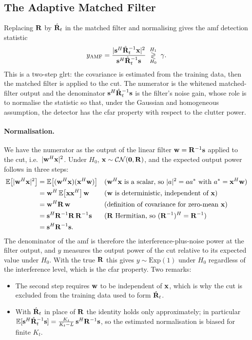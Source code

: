 \documentclass{article}
\begin{document}
\subsection{The Adaptive Matched Filter}
Replacing $\vb R$ by $\hat{\mathbf{R}}_t$ in the matched filter and normalising gives the \gls{amf} detection statistic
$$y_{\text{AMF}} = \frac{|\vb s^H\hat{\mathbf{R}}_t^{-1}\vb x|^2}
                        {\vb s^H\hat{\mathbf{R}}_t^{-1}\vb s}
   \;\underset{H_0}{\overset{H_1}{\gtrless}}\;\gamma.$$
This is a two-step \gls{glrt}: the covariance is estimated from the training data, then the matched filter is applied to the \gls{cut}. The numerator is the whitened matched-filter output and the denominator $\vb s^H\hat{\mathbf{R}}_t^{-1}\vb s$ is the filter's noise gain, whose role is to normalise the statistic so that, under the Gaussian and homogeneous assumption, the detector has the \gls{cfar} property with respect to the clutter power.

\paragraph{Normalisation.} We have the numerator as the output of the linear filter $\vb w = \mathbf{R}^{-1}\vb s$ applied to the \gls{cut}, i.e.\ $|\vb w^H\vb x|^2$. Under $H_0$, $\vb x\sim\mathcal{CN}(\vb 0,\mathbf{R})$, and the expected output power follows in three steps:
\begin{align*}
  \mathbb{E}\big[|\vb w^H\vb x|^2\big]
  &= \mathbb{E}\big[(\vb w^H\vb x)(\vb x^H\vb w)\big]
     && \text{($\vb w^H\vb x$ is a scalar, so $|a|^2=aa^*$ with $a^*=\vb x^H\vb w$)}\\
  &= \vb w^H\,\mathbb{E}\big[\vb x\vb x^H\big]\,\vb w
     && \text{($\vb w$ is deterministic, independent of $\vb x$)}\\
  &= \vb w^H\mathbf{R}\,\vb w
     && \text{(definition of covariance for zero-mean $\vb x$)}\\
  &= \vb s^H\mathbf{R}^{-1}\mathbf{R}\,\mathbf{R}^{-1}\vb s
     && \text{($\mathbf{R}$ Hermitian, so $(\mathbf{R}^{-1})^H=\mathbf{R}^{-1}$)}\\
  &= \vb s^H\mathbf{R}^{-1}\vb s.
\end{align*}
The denominator of the \gls{amf} is therefore the interference-plus-noise power at the filter output, and $y$ measures the output power of the \gls{cut} relative to its expected value under $H_0$. With the true $\mathbf{R}$ this gives $y\sim\mathrm{Exp}(1)$ under $H_0$ regardless of the interference level, which is the \gls{cfar} property. Two remarks:
\begin{itemize}
  \item The second step requires $\vb w$ to be independent of $\vb x$, which is why the \gls{cut} is excluded from the training data used to form $\hat{\mathbf{R}}_t$.
  \item With $\hat{\mathbf{R}}_t$ in place of $\mathbf{R}$ the identity holds only approximately; in particular $\mathbb{E}[\vb s^H\hat{\mathbf{R}}_t^{-1}\vb s]=\frac{K_t}{K_t-L}\,\vb s^H\mathbf{R}^{-1}\vb s$, so the estimated normalisation is biased for finite $K_t$.
\end{itemize}
\end{document}
